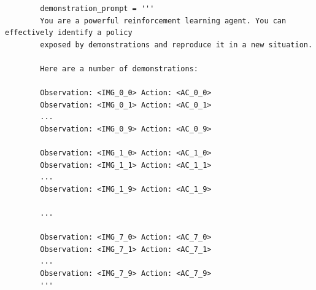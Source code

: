 \begin{listing}
    \caption{
        The frozen part of the evaluation prompt, which contains the expert demonstration episodes and stays constant throughout an evaluation episode.
        In this example, we have 8 demonstration episodes with 10 steps each and RGB observations.
        Before feeding the prompt to the model, we replace the observation and action placeholders with the actual observations (\ie images in this case) and action strings.
    }
    \label{code:frozen-prompt}
   \begin{verbatim}
        demonstration_prompt = '''
        You are a powerful reinforcement learning agent. You can effectively identify a policy
        exposed by demonstrations and reproduce it in a new situation.
        
        Here are a number of demonstrations:
        
        Observation: <IMG_0_0> Action: <AC_0_0>
        Observation: <IMG_0_1> Action: <AC_0_1>
        ...
        Observation: <IMG_0_9> Action: <AC_0_9>
        
        Observation: <IMG_1_0> Action: <AC_1_0>
        Observation: <IMG_1_1> Action: <AC_1_1>
        ...
        Observation: <IMG_1_9> Action: <AC_1_9>
        
        ...
        
        Observation: <IMG_7_0> Action: <AC_7_0>
        Observation: <IMG_7_1> Action: <AC_7_1>
        ...
        Observation: <IMG_7_9> Action: <AC_7_9>
        '''
    \end{verbatim}
\end{listing}

